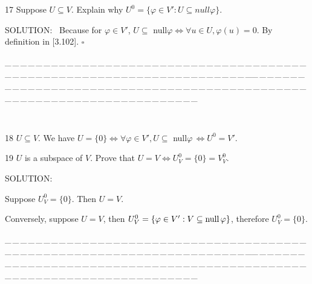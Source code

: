 \documentclass[a4paper, 11pt, UTF8]{article}
\def\null{\textup{null\,}}
\begin{document}
\begin{large}
{\timesbf\Large 17} {\timessl\Large
Suppose $U\subseteq V$. Explain why $U^0=\{\varphi\in V':U\subseteq null\varphi\}$.
}\par
{\timesbf S\footnotesize{OLUTION:}} \,\,\,Because for $\varphi\in V'$, $U\subseteq$ null$\varphi\Longleftrightarrow\forall u\in U,\varphi(u)=0$. By definition in [3.102]. $\square$\par
{\tiny \_\,\_\,\_\,\_\,\_\,\_\,\_\,\_\,\_\,\_\,\_\,\_\,\_\,\_\,\_\,\_\,\_\,\_\,\_\,\_\,\_\,\_\,\_\,\_\,\_\,\_\,\_\,\_\,\_\,\_\,\_\,\_\,\_\,\_\,\_\,\_\,\_\,\_\,\_\,\_\,\_\,\_\,\_\,\_\,\_\,\_\,\_\,\_\,\_\,\_\,\_\,\_\,\_\,\_\,\_\,\_\,\_\,\_\,\_\,\_\,\_\,\_\,\_\,\_\,\_\,\_\,\_\,\_\,\_\,\_\,\_\_\,\_\,\_\,\_\,\_\,\_\,\_\,\_\,\_\,\_\,\_\,\_\,\_\,\_\,\_\,\_\,\_\,\_\,\_\,\_\,\_\,\_\,\_\,\_\,\_\,\_\,\_\,\_\,\_\,\_\,\_\,\_\,\_\,\_\,\_\,\_\,\_\,\_\,\_\,\_\,\_\,\_\,\_\,\_\,\_\,\_\,\_\,\_\,\_\,\_\,\_\,\_\,\_\,\_\,\_\,\_\,\_\,\_\,\_\,\_\,\_\,\_\,\_\,\_\,\_\,\_\,\_\,\_\,\_\,\_\,\_}{\tiny\,\par}

{\timesbf\Large 18} {\timessl\Large $U\subseteq V$. We have $U=\{0\}\Longleftrightarrow\forall\varphi\in V', U\subseteq$ null$\varphi\,\Longleftrightarrow U^0=V'$.}\par
{\timesbf\Large 19} {\timessl\Large
$U$ is a subspace of $V$. Prove that $U=V\Longleftrightarrow U^0_V=\{0\}=V^0_V$.}\par
{\timesbf S\footnotesize{OLUTION:}}\par\quad
Suppose $U^0_V=\{0\}.$ Then $U=V$.\par\quad
Conversely, suppose $U=V$, then $U^0_V=\{\varphi\in V':V\subseteq\null\varphi\}$, therefore $U^0_V=\{0\}$.\par
{\tiny \_\,\_\,\_\,\_\,\_\,\_\,\_\,\_\,\_\,\_\,\_\,\_\,\_\,\_\,\_\,\_\,\_\,\_\,\_\,\_\,\_\,\_\,\_\,\_\,\_\,\_\,\_\,\_\,\_\,\_\,\_\,\_\,\_\,\_\,\_\,\_\,\_\,\_\,\_\,\_\,\_\,\_\,\_\,\_\,\_\,\_\,\_\,\_\,\_\,\_\,\_\,\_\,\_\,\_\,\_\,\_\,\_\,\_\,\_\,\_\,\_\,\_\,\_\,\_\,\_\,\_\,\_\,\_\,\_\,\_\,\_\_\,\_\,\_\,\_\,\_\,\_\,\_\,\_\,\_\,\_\,\_\,\_\,\_\,\_\,\_\,\_\,\_\,\_\,\_\,\_\,\_\,\_\,\_\,\_\,\_\,\_\,\_\,\_\,\_\,\_\,\_\,\_\,\_\,\_\,\_\,\_\,\_\,\_\,\_\,\_\,\_\,\_\,\_\,\_\,\_\,\_\,\_\,\_\,\_\,\_\,\_\,\_\,\_\,\_\,\_\,\_\,\_\,\_\,\_\,\_\,\_\,\_\,\_\,\_\,\_\,\_\,\_\,\_\,\_\,\_\,\_}\par


\end{large}
\end{document}

